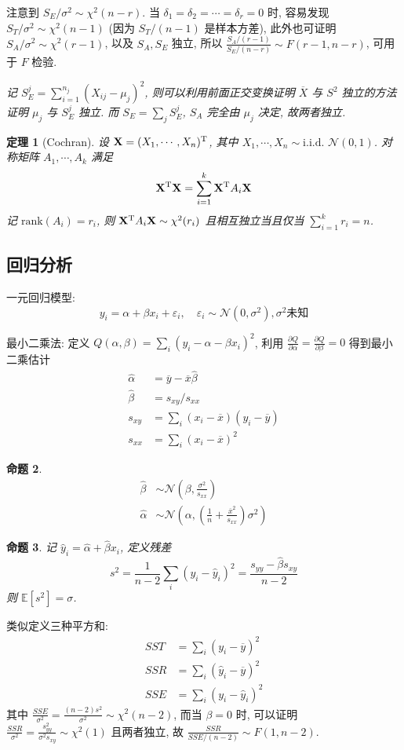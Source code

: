 \documentclass[8pt]{article}
\theoremstyle{compact}
\newtheorem{theorem}{定理}
\newtheorem{proposition}[theorem]{命题}
\def\E#1{\mathbb{E}\left[{#1}\right]}
\begin{document}
注意到 $S_E / \sigma^2 \sim \chi^2(n - r)$. 当 $\delta_1 = \delta_2 = \cdots = \delta_r = 0$ 时, 容易发现 $S_T / \sigma^2 \sim \chi^2(n - 1)$ (因为 $S_T / (n-1)$ 是样本方差), 此外也可证明 $S_A / \sigma^2 \sim \chi^2(r - 1)$, 以及 $S_A, S_E$ 独立, 所以 $\frac{S_A / (r - 1)}{S_E / (n - r)} \sim F(r - 1, n - r)$, 可用于 $F$ 检验. 

\textit{记 $S_E^j = \sum_{i=1}^{n_j} (X_{ij} - \mu_j)^2$, 则可以利用前面正交变换证明 $\overline{X}$ 与 $S^2$ 独立的方法证明 $\mu_j$ 与 $S_E^j$ 独立. 而 $S_E = \sum_j S_E^j$, $S_A$ 完全由 $\mu_j$ 决定, 故两者独立.}

\begin{theorem}[Cochran]
	设 $\mathbf X = (X_1, \cdots, X_n)^{\text T}$, 其中 $X_1, \cdots, X_n \sim \text{i.i.d. } \mathcal N(0, 1)$. 对称矩阵 $A_1, \cdots, A_k$ 满足 $$\mathbf X^{\text T}\mathbf X = \sum_{i=1}^{k} \mathbf X^{\text T}A_i\mathbf X$$ 记 $\text{rank}(A_i) = r_i$, 则 $\mathbf X^{\text T}A_i\mathbf X \sim \chi^2(r_i)$ 且相互独立当且仅当 $\sum_{i=1}^{k} r_i = n$. 
\end{theorem}

\subsection{回归分析}
一元回归模型: $$y_i = \alpha + \beta x_i + \varepsilon_i, \quad \varepsilon_i \sim \mathcal N(0, \sigma^2), \sigma^2\mbox{未知}$$

最小二乘法: 定义 $Q(\alpha, \beta) = \sum_i (y_i - \alpha - \beta x_i)^2$, 利用 $\frac{\partial Q}{\partial \alpha} = \frac{\partial Q}{\partial \beta} = 0$ 得到最小二乘估计 \begin{align*}
	\hat\alpha &= \overline{y} - \overline{x}\hat\beta \\
	\hat\beta &= s_{xy} / s_{xx} \\
	s_{xy} &= \sum_i (x_i - \overline{x})(y_i - \overline{y}) \\
	s_{xx} &= \sum_i (x_i - \overline{x})^2
\end{align*}
\begin{proposition}
	\begin{align*}
		\hat\beta &\sim \mathcal N\left(\beta, \frac{\sigma^2}{s_{xx}}\right) \\
		\hat\alpha &\sim \mathcal N\left(\alpha, \left(\frac1n + \frac{\overline{x}^2}{s_{xx}}\right)\sigma^2\right)
	\end{align*}
\end{proposition}
\begin{proposition}
	记 $\hat{y}_i = \hat\alpha + \hat\beta x_i$, 定义残差 $$s^2 = \frac{1}{n-2}\sum_i(y_i - \hat y_i)^2 = \frac{s_{yy} - \hat\beta s_{xy}}{n-2}$$ 则 $\E{s^2} = \sigma$.
\end{proposition}
类似定义三种平方和: \begin{align*}
	SST &= \sum_i (y_i - \overline{y})^2 \\
	SSR &= \sum_i (\hat y_i - \overline{y})^2 \\
	SSE &= \sum_i (y_i - \hat y_i)^2
\end{align*}
其中 $\frac{SSE}{\sigma^2} = \frac{(n-2)s^2}{\sigma^2} \sim \chi^2(n - 2)$, 而当 $\beta = 0$ 时, 可以证明 $\frac{SSR}{\sigma^2} = \frac{s_{yy}^2}{\sigma^2s_{xy}} \sim \chi^2(1)$ 且两者独立, 故 $\frac{SSR}{SSE / (n - 2)} \sim F(1, n - 2)$.
\end{document}
